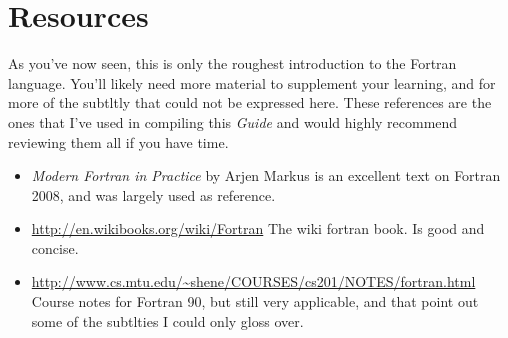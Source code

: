 
\section{Resources}
As you've now seen, this is only the roughest introduction to the Fortran language.
 You'll likely need more material to supplement your learning, and for more of the subtltly that could not be expressed here.
 These references are the ones that I've used in compiling this \emph{Guide} and would highly recommend reviewing them all if you have time.

\begin{itemize}
 \item \emph{Modern Fortran in Practice} by Arjen Markus
 is an excellent text on Fortran 2008, and was largely used as reference.
 \item \url{http://en.wikibooks.org/wiki/Fortran}
 The wiki fortran book. Is good and concise.
 \item \url{http://www.cs.mtu.edu/~shene/COURSES/cs201/NOTES/fortran.html}
 Course notes for Fortran 90, but still very applicable, and that point out some of the subtlties I could only gloss over.
\end{itemize}

